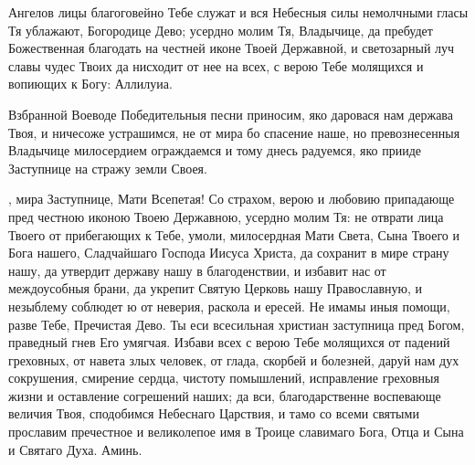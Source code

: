 \begin{mymulticols}

\vspace{-\baselineskip}



Ангелов лицы благоговейно Тебе служат и вся Небесныя силы немолчными гласы Тя ублажают, Богородице Дево; усердно молим Тя, Владычице, да пребудет Божественная благодать на честней иконе Твоей Державной, и светозарный луч славы чудес Твоих да нисходит от нее на всех, с верою Тебе молящихся и вопиющих к Богу: Аллилуиа.


Взбранной Воеводе Победительныя песни приносим, яко даровася нам держава Твоя, и ничесоже устрашимся, не от мира бо спасение наше, но превознесенныя Владычице милосердием ограждаемся и тому днесь радуемся, яко прииде Заступнице на стражу земли Своея.


{, мира Заступнице, Мати Всепетая! Со страхом, верою и любовию припадающе пред честною иконою Твоею Державною, усердно молим Тя: не отврати лица Твоего от прибегающих к Тебе, умоли, милосердная Мати Света, Сына Твоего и Бога нашего, Сладчайшаго Господа Иисуса Христа, да сохранит в мире страну нашу, да утвердит державу нашу в благоденствии, и избавит нас от междоусобныя брани, да укрепит Святую Церковь нашу Православную, и незыблему соблюдет ю от неверия, раскола и ересей. Не имамы иныя помощи, разве Тебе, Пречистая Дево. Ты еси всесильная христиан заступница пред Богом, праведный гнев Его умягчая. Избави всех с верою Тебе молящихся от падений греховных, от навета злых человек, от глада, скорбей и болезней, даруй нам дух сокрушения, смирение сердца, чистоту помышлений, исправление греховныя жизни и оставление согрешений наших; да вси, благодарственне воспевающе величия Твоя, сподобимся Небеснаго Царствия, и тамо со всеми святыми прославим пречестное и великолепое имя в Троице славимаго Бога, Отца и Сына и Святаго Духа. Аминь.}

\end{mymulticols}

\mychapterending

